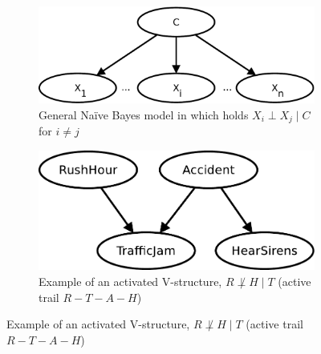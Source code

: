 \documentclass[english,cover]{fitthesis} %
\begin{document}
\begin{center}
\begin{figure}[h]
    \begin{subfigure}[b]{0.42\linewidth}
        \includegraphics[scale=0.4]{fig/bn-naive-bayes}
        \caption{General Naïve Bayes model in which holds $X_i \perp X_j \mid C$ for $i \neq j$}
        \label{fig:bn_d-separation_a}
    \end{subfigure}
    \qquad\qquad\qquad
    \begin{subfigure}[b]{0.42\linewidth}
        \includegraphics[scale=0.4]{fig/bn-d_sep-traffic}
        \caption{Example of an activated V-structure, $R\not\perp H \mid T$ (active trail $R-T-A-H$)}
        \label{fig:bn_d-separation_traffic}
    \end{subfigure}
  

\end{figure}
\end{center}
\end{document}
